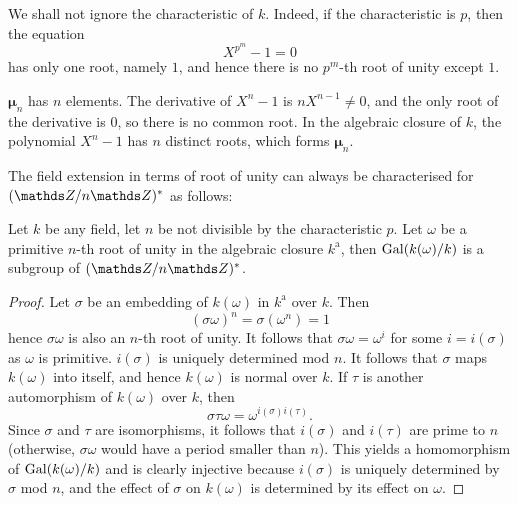 				\begin{remark}
					We shall not ignore the characteristic of $k$. Indeed, if the characteristic is $p$, then the equation
					\[
						X^{p^m}-1=0
					\]
					has only one root, namely $1$, and hence there is no $p^m$-th root of unity except $1$.
				\end{remark}
				\begin{remark}
					$\bm{\mu}_n$ has $n$ elements. The derivative of $X^n-1$ is $nX^{n-1} \ne 0$, and the only root of the derivative is $0$, so there is no common root. In the algebraic closure of $k$, the polynomial $X^n-1$ has $n$ distinct roots, which forms $\bm{\mu}_n$.
				\end{remark}
				
				The field extension in terms of root of unity can always be characterised for $(\Z/n\Z)^\ast$ as follows:
				
				\begin{theorem}\label{gal-cyclotomic}
					Let $k$ be any field, let $n$ be not divisible by the characteristic $p$. Let $\omega$ be a primitive $n$-th root of unity in the algebraic closure $k^\mathrm{a}$, then $\operatorname{Gal}(k(\omega)/k)$ is a subgroup of $(\Z/n\Z)^\ast$.
				\end{theorem}
				
				\begin{proof}
					Let $\sigma$ be an embedding of $k(\omega)$ in $k^\mathrm{a}$ over $k$. Then
					\[
						(\sigma\omega)^n = \sigma(\omega^n)=1
					\]
					hence $\sigma\omega$ is also an $n$-th root of unity. It follows that $\sigma\omega=\omega^i$ for some $i=i(\sigma)$ as $\omega$ is primitive. $i(\sigma)$ is uniquely determined mod $n$. It follows that $\sigma$ maps $k(\omega)$ into itself, and hence $k(\omega)$ is normal over $k$. If $\tau$ is another automorphism of $k(\omega)$ over $k$, then
					\[
						\sigma\tau\omega = \omega^{i(\sigma)i(\tau)}.
					\]
					Since $\sigma$ and $\tau$ are isomorphisms, it follows that $i(\sigma)$ and $i(\tau)$ are prime to $n$ (otherwise, $\sigma\omega$ would have a period smaller than $n$). This yields a homomorphism of $\operatorname{Gal}(k(\omega)/k)$ and is clearly injective because $i(\sigma)$ is uniquely determined by $\sigma$ mod $n$, and the effect of $\sigma$ on $k(\omega)$ is determined by its effect on $\omega$.
				\end{proof}
				

